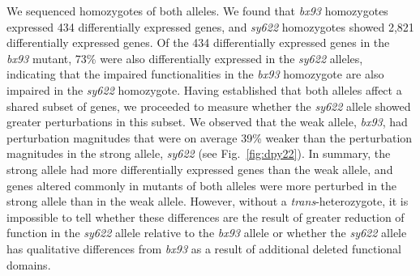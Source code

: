 \documentclass[10pt, onecolumn]{article}
\newcommand{\strongn}{2,821}
\newcommand{\weakn}{434}
\begin{document}
We sequenced homozygotes of both alleles. We found that \emph{bx93} homozygotes
expressed \weakn{} differentially expressed genes, and \emph{sy622} homozygotes
showed \strongn{} differentially expressed genes. Of the \weakn{} differentially
expressed genes in the \emph{bx93} mutant, 73\% were also differentially
expressed in the \emph{sy622} alleles, indicating that the impaired
functionalities in the \emph{bx93} homozygote are also impaired in the
\emph{sy622} homozygote. Having established that both alleles affect a
shared subset of genes, we proceeded to measure whether the \emph{sy622} allele
showed greater perturbations in this subset. We observed that the weak allele,
\emph{bx93}, had perturbation magnitudes that were on average 39\% weaker than
the perturbation magnitudes in the strong allele, \emph{sy622} (see
Fig.~\ref{fig:dpy22}). In summary, the strong allele had more differentially
expressed genes than the weak allele, and genes altered commonly in mutants of
both alleles were more perturbed in the strong allele than in the weak allele.
However, without a \emph{trans}-heterozygote, it is impossible to tell whether
these differences are the result of greater reduction of function in the
\emph{sy622} allele relative to the \emph{bx93} allele or whether the
\emph{sy622} allele has qualitative differences from \emph{bx93} as a result of
additional deleted functional domains.
\end{document}
